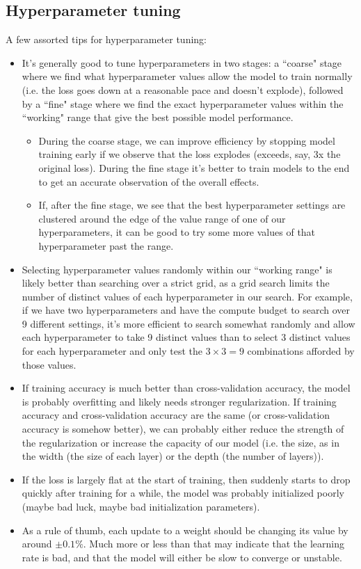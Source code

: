 \subsection{Hyperparameter tuning}
A few assorted tips for hyperparameter tuning:
\begin{itemize}
\item It's generally good to tune hyperparameters in two stages: a ``coarse" stage where we find what hyperparameter values allow the model to train normally (i.e. the loss goes down at a reasonable pace and doesn't explode), followed by a ``fine" stage where we find the exact hyperparameter values within the ``working" range that give the best possible model performance.
\begin{itemize}
\item During the coarse stage, we can improve efficiency by stopping model training early if we observe that the loss explodes (exceeds, say, 3x the original loss). During the fine stage it's better to train models to the end to get an accurate observation of the overall effects.
\item If, after the fine stage, we see that the best hyperparameter settings are clustered around the edge of the value range of one of our hyperparameters, it can be good to try some more values of that hyperparameter past the range.
\end{itemize}
\item Selecting hyperparameter values randomly within our ``working range" is likely better than searching over a strict grid, as a grid search limits the number of distinct values of each hyperparameter in our search. For example, if we have two hyperparameters and have the compute budget to search over 9 different settings, it's more efficient to search somewhat randomly and allow each hyperparameter to take 9 distinct values than to select 3 distinct values for each hyperparameter and only test the $3 \times 3 = 9$ combinations afforded by those values.
\item If training accuracy is much better than cross-validation accuracy, the model is probably overfitting and likely needs stronger regularization. If training accuracy and cross-validation accuracy are the same (or cross-validation accuracy is somehow better), we can probably either reduce the strength of the regularization or increase the capacity of our model (i.e. the size, as in the width (the size of each layer) or the depth (the number of layers)).
\item If the loss is largely flat at the start of training, then suddenly starts to drop quickly after training for a while, the model was probably initialized poorly (maybe bad luck, maybe bad initialization parameters).
\item As a rule of thumb, each update to a weight should be changing its value by around $\pm 0.1\%$. Much more or less than that may indicate that the learning rate is bad, and that the model will either be slow to converge or unstable.
\end{itemize}
